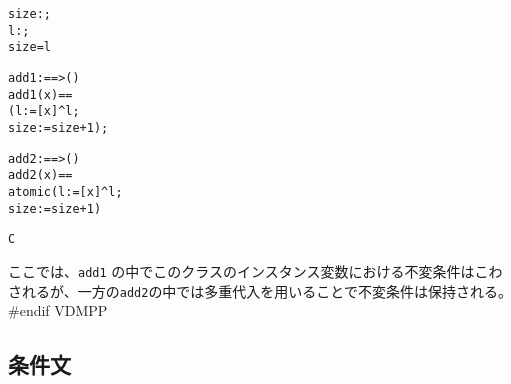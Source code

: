 \documentclass[\pformat,12pt]{jarticle}
\begin{document}
\begin{description}
\begin{alltt}
      size : ;
      l : ;
     size =  l

      add1 :  ==> ()
      add1 (x) ==
         ( l := [x] ^ l;
           size := size + 1);

      add2 :  ==> ()
      add2 (x) ==
         atomic (l := [x] ^ l;
                 size := size + 1)

   C
  \end{alltt}
ここでは、\texttt{add1} の中でこのクラスのインスタンス変数における不変条件はこわされるが、一方の\texttt{add2}の中では多重代入を用いることで不変条件は保持される。
#endif VDMPP

\end{description}

\subsection{条件文}\label{condstmt}
\end{document}
